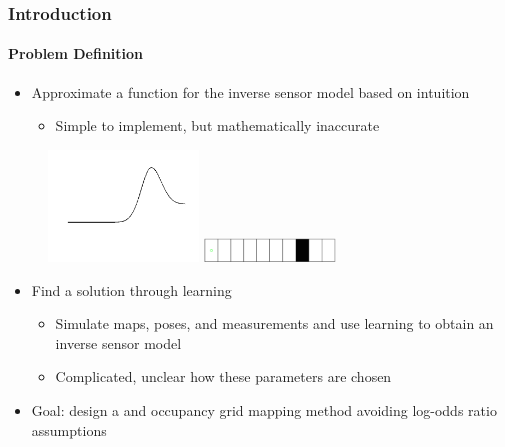 \documentclass[11pt,professionalfonts,hyperref={pdftex,pdfpagemode=none,pdfstartview=FitH}]{beamer}
\renewcommand{\emph}[1]{\textit{\textbf{\color{blue}{#1}}}}
\begin{document}
\begin{frame}
\frametitle{Introduction}
\framesubtitle{Problem Definition}

\begin{minipage}[t]{7.0cm}
\begin{itemize}
	\item Approximate a function for the inverse sensor model based on intuition
	\begin{itemize}
		\item Simple to implement, but mathematically inaccurate
	\end{itemize}
\end{itemize}
\end{minipage}
\begin{minipage}[t]{3.0cm}
\begin{figure}[!htbp]
\centerline{
    \vspace*{-0.5cm}
    \includegraphics[width=4.0cm]{Approx_ISM_shortened.png}\hspace*{0.1cm}
    }
\centerline{
    \includegraphics[width=3.5cm]{1D_True_Grid.png}
    }
		\end{figure}
\end{minipage}
\vspace*{-0.5cm}
\begin{itemize}
	\item Find a solution through learning
	\begin{itemize}
		\item Simulate maps, poses, and measurements and use learning to obtain an inverse sensor model
		\item Complicated, unclear how these parameters are chosen
	\end{itemize}
	\item Goal: design a \emph{simple} and \emph{accurate} occupancy grid mapping method avoiding log-odds ratio assumptions
\end{itemize}
%

\end{frame}
\end{document}
